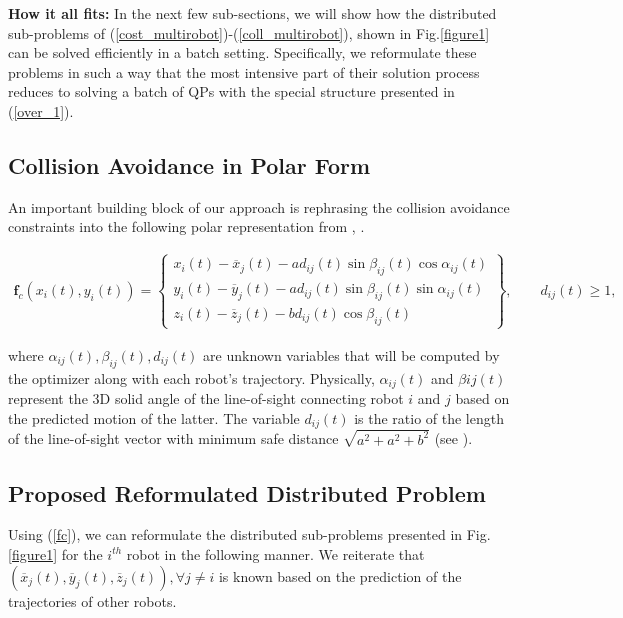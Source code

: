 \noindent \textbf{How it all fits:} In the next few sub-sections, we will show how the distributed sub-problems of (\ref{cost_multirobot})-(\ref{coll_multirobot}), shown in Fig.\ref{figure1} can be solved efficiently in a batch setting. Specifically, we reformulate these problems in such a way that the most intensive part of their solution process reduces to solving a batch of QPs with the special structure presented in (\ref{over_1}). 

\subsection{Collision Avoidance in Polar Form}
\noindent An important building block of our approach is rephrasing the collision avoidance constraints into the following polar representation from \citep{aks_ral21}, \citep{rastgar2020novel}.

\begin{align}
\textbf{f}_{c}(x_{i}(t),y_{i}(t)) = 
\left \{ \begin{array}{lcr}
x_{i}(t) - \overline{x}_{j}(t) - ad_{ij}(t)\sin{\beta_{ij}(t)}\cos{\alpha_{ij}(t)} \\
y_{i}(t) - \overline{y}_{j}(t) - ad_{ij}(t)\sin{\beta_{ij}(t)}\sin{\alpha_{ij}(t)} \\
z_{i}(t) - \overline{z}_{j}(t) - bd_{ij}(t)\cos{\beta_{ij}(t)}
\end{array} \right \},  \qquad  d_{ij}(t) \geq 1,
\label{fc} 
\end{align}

\noindent where $\alpha_{ij}(t), \beta_{ij}(t), d_{ij}(t)$  are unknown variables that will be computed by the optimizer along with each robot's trajectory. Physically, $\alpha_{ij}(t)$ and $\beta{ij}(t)$ represent the 3D solid angle of the line-of-sight connecting robot $i$ and $j$ based on the predicted motion of the latter. The variable $d_{ij}(t)$ is the ratio of the length of the line-of-sight vector with minimum safe distance $\sqrt{a^2+a^2+b^2}$ (see \citep{aks_ral21}).

\subsection{Proposed Reformulated Distributed Problem}
\noindent Using (\ref{fc}), we can reformulate the distributed sub-problems presented in Fig.\ref{figure1} for the $i^{th}$ robot in the following manner. We reiterate that $(\overline{x}_j(t), \overline{y}_j(t), \overline{z}_j(t)), \forall j\neq i $ is known based on the prediction of the trajectories of other robots.

